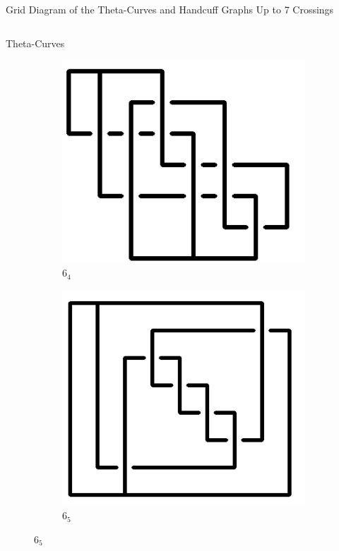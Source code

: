 \documentclass[final]{beamer}
\begin{document}
\begin{frame}[t]
\begin{alertblock}{Grid Diagram of the Theta-Curves and Handcuff Graphs Up to 7 Crossings}
\begin{columns}[t]
\begin{column}{0.5\textwidth}
\begin{alertblock}{Theta-Curves}
\begin{figure}
    \begin{subfigure}{0.075\textwidth}
    \includegraphics[width=\columnwidth]{../Midterm_Poster/grid_diagram/theta_6_4.png}
    \caption{$6_4$} 
    \end{subfigure}
    \begin{subfigure}{0.075\textwidth}
    \includegraphics[width=\columnwidth]{../Midterm_Poster/grid_diagram/theta_6_5.png}
    \caption{$6_5$} 
    \end{subfigure}

\end{figure}
\end{alertblock}
\end{column}
\end{columns}
\end{alertblock}
\end{frame}
\end{document}
